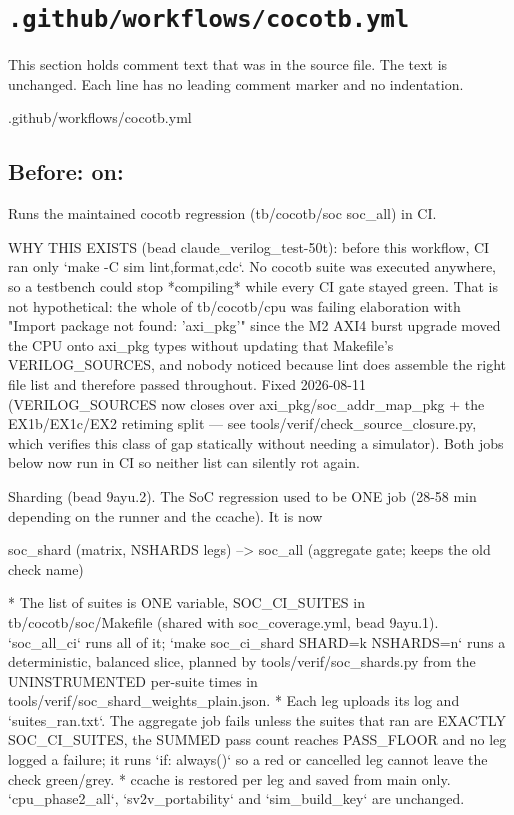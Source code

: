 \section{\texttt{.github/workflows/cocotb.yml}}\label{um:flow:ci-cocotb}

This section holds comment text that was in the source file. The text is unchanged. Each line has no leading comment marker and no indentation.

\begin{relocated}{.github/workflows/cocotb.yml}

\subsection*{Before: on:}

\begin{textblock}
Runs the maintained cocotb regression (tb/cocotb/soc soc_all) in CI.

WHY THIS EXISTS (bead claude_verilog_test-50t): before this workflow, CI ran
only `make -C sim {lint,format,cdc}`. No cocotb suite was executed anywhere,
so a testbench could stop *compiling* while every CI gate stayed green. That
is not hypothetical: the whole of tb/cocotb/cpu was failing elaboration with
"Import package not found: 'axi_pkg'" since the M2 AXI4 burst upgrade moved
the CPU onto axi_pkg types without updating that Makefile's VERILOG_SOURCES,
and nobody noticed because lint does assemble the right file list and
therefore passed throughout. Fixed 2026-08-11 (VERILOG_SOURCES now closes
over axi_pkg/soc_addr_map_pkg + the EX1b/EX1c/EX2 retiming split — see
tools/verif/check_source_closure.py, which verifies this class of gap
statically without needing a simulator). Both jobs below now run in CI so
neither list can silently rot again.

Sharding (bead 9ayu.2).  The SoC regression used to be ONE job (28-58 min depending on the runner
and the ccache).  It is now

  soc_shard (matrix, NSHARDS legs) --> soc_all  (aggregate gate; keeps the old check name)

* The list of suites is ONE variable, SOC_CI_SUITES in tb/cocotb/soc/Makefile (shared with
  soc_coverage.yml, bead 9ayu.1).  `soc_all_ci` runs all of it; `make soc_ci_shard SHARD=k
  NSHARDS=n` runs a deterministic, balanced slice, planned by tools/verif/soc_shards.py from the
  UNINSTRUMENTED per-suite times in tools/verif/soc_shard_weights_plain.json.
* Each leg uploads its log and `suites_ran.txt`.  The aggregate job fails unless the suites that
  ran are EXACTLY SOC_CI_SUITES, the SUMMED pass count reaches PASS_FLOOR and no leg logged a
  failure; it runs `if: always()` so a red or cancelled leg cannot leave the check green/grey.
* ccache is restored per leg and saved from main only.
`cpu_phase2_all`, `sv2v_portability` and `sim_build_key` are unchanged.


\end{textblock}
\end{relocated}
